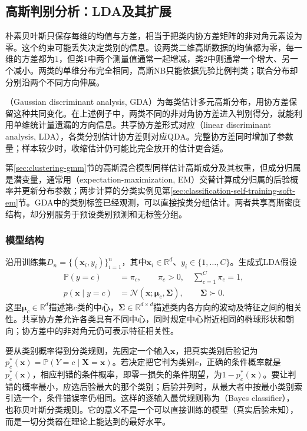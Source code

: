 \subsection{高斯判别分析：LDA及其扩展}
\label{sec:classification-gda}

朴素贝叶斯只保存每维的均值与方差，相当于把类内协方差矩阵的非对角元素设为零。这个约束可能丢失决定类别的信息。设两类二维高斯数据的均值都为零，每一维的方差都为$1$，但类1中两个测量值通常一起增减，类2中则通常一个增大、另一个减小。两类的单维分布完全相同，高斯NB只能依据先验比例判类；联合分布却分别沿两个不同方向伸展。

（Gaussian discriminant analysis, GDA）为每类估计多元高斯分布，用协方差保留这种共同变化。在上述例子中，两类不同的非对角协方差进入判别得分，就能利用单维统计量遗漏的方向信息。共享协方差形式对应（linear discriminant analysis, LDA），各类分别估计协方差则对应QDA。完整协方差同时增加了参数量；样本较少时，收缩估计仍可能比完全放开的估计更合适。

第\ref{sec:clustering-gmm}节的高斯混合模型同样估计高斯成分及其权重，但成分归属是潜变量，通常用（expectation-maximization, EM）交替计算成分归属的后验概率并更新分布参数；两步计算的分类实例见第\ref{sec:classification-self-training-soft-em}节。GDA中的类别标签已经观测，可以直接按类分组估计。两者共享高斯密度结构，却分别服务于预设类别预测和无标签分组。

\subsubsection{模型结构}
\label{sec:classification-lda-model}

沿用训练集$D_n=\{(\bm{x}_i,y_i)\}_{i=1}^{n}$，其中$\bm{x}_i\in\mathbb{R}^{d}$、$y_i\in\{1,\ldots,C\}$。生成式LDA假设
\begin{equation}
  \label{eq:classification-lda-distribution}
  \begin{aligned}
    \mathbb{P}(y=c)&=\pi_c,\qquad \pi_c>0,\quad
      \sum_{c=1}^{C}\pi_c=1,\\
    p(\bm{x}\mid y=c)&=\mathcal{N}(\bm{x};\bm{\mu}_c,\bm{\Sigma}),
      \qquad \bm{\Sigma}\succ0 .
  \end{aligned}
\end{equation}
这里$\bm{\mu}_c\in\mathbb{R}^{d}$描述第$c$类的中心，$\bm{\Sigma}\in\mathbb{R}^{d\times d}$描述类内各方向的波动及特征之间的相关性。共享协方差允许各类具有不同中心，同时规定中心附近相同的椭球形状和朝向；协方差中的非对角元仍可表示特征相关性。

要从类别概率得到分类规则，先固定一个输入$\bm x$，把真实类别后验记为$p_c^\ast(\bm x)=\mathbb P(Y=c\mid\bm X=\bm x)$。若决定把它判为类别$c$，正确的条件概率就是$p_c^\ast(\bm x)$，相应判错的条件概率，即零一损失的条件期望，为$1-p_c^\ast(\bm x)$。要让判错的概率最小，应选后验最大的那个类别；后验并列时，从最大者中按最小类别索引选一个，条件错误率仍相同。这样的逐输入最优规则称为（Bayes classifier），也称贝叶斯分类规则。它的意义不是一个可以直接训练的模型（真实后验未知），而是一切分类器在理论上能达到的最好水平。

